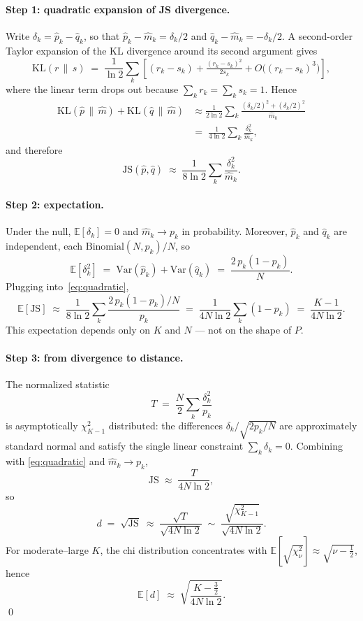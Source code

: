 \documentclass[11pt]{article}
\begin{document}
\paragraph{Step 1: quadratic expansion of JS divergence.}
Write $\delta_k = \hat p_k - \hat q_k$, so that
$\hat p_k - \hat m_k = \delta_k/2$ and
$\hat q_k - \hat m_k = -\delta_k/2$. A second-order Taylor expansion of
the KL divergence around its second argument gives
\[
  \mathrm{KL}(r \,\|\, s) \;=\; \frac{1}{\ln 2}\sum_k
  \left[(r_k-s_k) + \tfrac{(r_k-s_k)^2}{2s_k} + O\!\big((r_k-s_k)^3\big)\right],
\]
where the linear term drops out because $\sum_k r_k=\sum_k s_k=1$. Hence
\begin{align*}
  \mathrm{KL}(\hat p \,\|\, \hat m) +
  \mathrm{KL}(\hat q \,\|\, \hat m)
  &\approx
  \frac{1}{2\ln 2}
  \sum_k \frac{(\delta_k/2)^2 + (\delta_k/2)^2}{\hat m_k}
  \\&=\;
  \frac{1}{4\ln 2}\sum_k \frac{\delta_k^2}{\hat m_k},
\end{align*}
and therefore
\begin{equation}\label{eq:quadratic}
  \mathrm{JS}(\hat p,\hat q)
  \;\approx\;
  \frac{1}{8\ln 2}\sum_k \frac{\delta_k^2}{\hat m_k}.
\end{equation}

\paragraph{Step 2: expectation.}
Under the null, $\mathbb{E}[\delta_k]=0$ and $\hat m_k \to p_k$ in
probability. Moreover, $\hat p_k$ and $\hat q_k$ are independent, each
$\mathrm{Binomial}(N,p_k)/N$, so
\[
  \mathbb{E}[\delta_k^2] \;=\; \mathrm{Var}(\hat p_k) + \mathrm{Var}(\hat q_k)
  \;=\; \frac{2\,p_k(1-p_k)}{N}.
\]
Plugging into~\eqref{eq:quadratic},
\begin{equation}\label{eq:EJS}
  \mathbb{E}[\mathrm{JS}]
  \;\approx\;
  \frac{1}{8\ln 2}\sum_k \frac{2\,p_k(1-p_k)/N}{p_k}
  \;=\;
  \frac{1}{4N\ln 2}\sum_k (1-p_k)
  \;=\;
  \frac{K-1}{4N\ln 2}.
\end{equation}
This expectation depends only on $K$ and $N$ --- not on the shape of $P$.

\paragraph{Step 3: from divergence to distance.}
The normalized statistic
\[
  T \;=\; \frac{N}{2}\sum_k \frac{\delta_k^2}{p_k}
\]
is asymptotically $\chi^2_{K-1}$ distributed: the differences
$\delta_k/\sqrt{2p_k/N}$ are approximately standard normal and satisfy
the single linear constraint $\sum_k \delta_k = 0$. Combining with
\eqref{eq:quadratic} and $\hat m_k \to p_k$,
\[
  \mathrm{JS}\;\approx\; \frac{T}{4N\ln 2},
\]
so
\[
  d \;=\; \sqrt{\mathrm{JS}} \;\approx\;
  \frac{\sqrt{T}}{\sqrt{4N\ln 2}}
  \;\sim\;
  \frac{\sqrt{\chi^2_{K-1}}}{\sqrt{4N\ln 2}}.
\]
For moderate--large $K$, the chi distribution concentrates with
\(\mathbb{E}\!\left[\sqrt{\chi^2_\nu}\right] \approx \sqrt{\nu-\tfrac12}\),
hence
\[
  \mathbb{E}[d] \;\approx\; \sqrt{\frac{K-\tfrac32}{4N\ln 2}}.
\]
\qed
\end{document}

